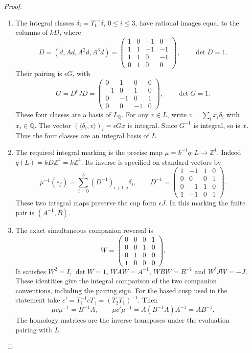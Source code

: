 \documentclass[11pt,a4paper]{article}
\numberwithin{equation}{section}
\theoremstyle{definition}
\begin{document}
\begin{proof}
\begin{enumerate}[label=\arabic*.]
\item The integral classes
$\delta_i=T_1^{-i}\delta$, $0\leq i\leq3$, have rational images
equal to the columns of $kD$, where
\[
 D=(d,Ad,A^2d,A^3d)=
 \begin{pmatrix}1&0&-1&0\\1&1&-1&-1\\1&1&0&-1\\0&1&0&0\end{pmatrix},
 \qquad \det D=1.
\]
Their pairing is $\epsilon G$, with
\[
 G=D^tJD=
 \begin{pmatrix}0&1&0&0\\-1&0&1&0\\0&-1&0&1\\0&0&-1&0\end{pmatrix},
 \qquad \det G=1.
\]
These four classes are a basis of $L_{\mathbb Q}$. For any $v\in L$,
write $v=\sum_i x_i\delta_i$ with $x_i\in\mathbb Q$.
The vector $(\langle\delta_i,v\rangle)_i=\epsilon Gx$ is integral.
Since $G^{-1}$ is integral, so is $x$. Thus the four classes are an
integral basis of $L$.

\item The required integral marking is the precise map
$\mu=k^{-1}q:L\longrightarrow\mathbb Z^4$.
Indeed $q(L)=kD\mathbb Z^4=k\mathbb Z^4$. Its inverse is specified
on standard vectors by
\[
 \mu^{-1}(e_j)=\sum_{i=0}^3(D^{-1})_{i+1,j}\delta_i,
 \qquad
 D^{-1}=\begin{pmatrix}1&-1&1&0\\0&0&0&1\\0&-1&1&0\\1&-1&0&1\end{pmatrix}.
\]
These two integral maps preserve the cup form
$\epsilon J$. In this marking the finite pair is $(A^{-1},B)$.

\item The exact simultaneous companion reversal is
\[
 W=\begin{pmatrix}0&0&0&1\\0&0&1&0\\0&1&0&0\\1&0&0&0\end{pmatrix}.
\]
It satisfies $W^2=I$, $\det W=1$, $WAW=A^{-1}$,
$WBW=B^{-1}$ and $W^tJW=-J$. These identities give the integral comparison of the two companion conventions, including
the pairing sign. For the based cusp used in the statement take
$c'=T_1^{-1}cT_1=(T_2T_1)^{-1}$. Then
\[
 \mu c\mu^{-1}=B^{-1}A,\qquad
 \mu c'\mu^{-1}=A(B^{-1}A)A^{-1}=AB^{-1}.
\]
The homology matrices are the inverse transposes under the evaluation pairing with $L$.


\end{enumerate}
\end{proof}
\end{document}
